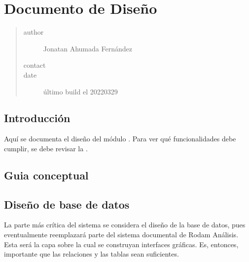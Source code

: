 \documentclass[letterpaper,10pt,spanish]{sphinxmanual}
\begin{document}



\chapter{Documento de Diseño}
\label{\detokenize{requerimientos/SDD:documento-de-diseno}}\label{\detokenize{requerimientos/SDD::doc}}\begin{quote}\begin{description}
\item[{author}] \leavevmode
Jonatan Ahumada Fernández

\item[{contact}] \leavevmode
{}

\item[{date}] \leavevmode
último build el 2022\sphinxhyphen{}03\sphinxhyphen{}29

\end{description}\end{quote}


\section{Introducción}
\label{\detokenize{requerimientos/SDD:introduccion}}
Aquí se documenta el diseño del módulo .  Para ver qué
funcionalidades debe cumplir, se debe revisar la .


\section{Guia conceptual}
\label{\detokenize{requerimientos/SDD:guia-conceptual}}


\section{Diseño de base de datos}
\label{\detokenize{requerimientos/SDD:diseno-de-base-de-datos}}
La parte más crítica del sistema se considera el diseño de la base de
datos, pues eventualmente reemplazará parte del sistema documental de
Rodam Análisis. Esta será la capa sobre la cual se construyan
interfaces gráficas. Es, entonces, importante que las relaciones y las
tablas sean suficientes.
\end{document}
